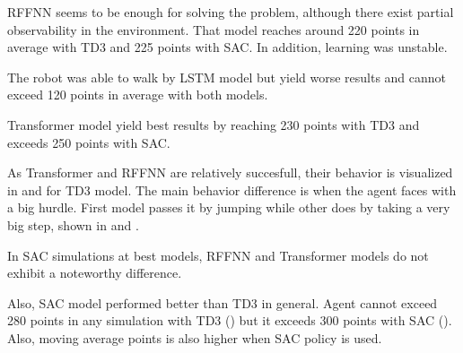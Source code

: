 RFFNN seems to be enough for solving the problem, although there exist partial observability in the environment. 
That model reaches around 220 points in average with TD3 and 225 points with SAC. In addition, learning was unstable. 

The robot was able to walk by LSTM model but yield worse results and cannot exceed 120 points in average with both models. 

Transformer model yield best results by reaching 230 points with TD3 and exceeds 250 points with SAC. 

As Transformer and RFFNN are relatively succesfull, their behavior is visualized in  and  for TD3 model. 
The main behavior difference is when the agent faces with a big hurdle. 
First model passes it by jumping while other does by taking a very big step, shown in  and .

In SAC simulations at best models, RFFNN and Transformer models do not exhibit a noteworthy difference.

Also, SAC model performed better than TD3 in general. 
Agent cannot exceed 280 points in any simulation with TD3 () but it exceeds 300 points with SAC (). Also, moving average points is also higher when SAC policy is used. 

